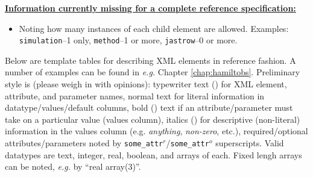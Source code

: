 \textbf{\underline{Information currently missing for a complete reference specification:}}
\begin{itemize}
  \item{Noting how many instances of each child element are allowed.  Examples: \texttt{simulation}--1 only, \texttt{method}--1 or more, \texttt{jastrow}--0 or more}.
\end{itemize}


Below are template tables for describing XML elements in reference fashion.  A number of examples can be found in \textit{e.g.} Chapter \ref{chap:hamiltobs}.  Preliminary style is (please weigh in with opinions): typewriter text (\ilatex{\\texttt\{\}}) for XML element, attribute, and parameter names, normal text for literal information in datatype/values/default columns, bold (\ilatex{\\textbf\{\}}) text if an attribute/parameter must take on a particular value (values column), italics (\ilatex{\\textit\{\}}) for descriptive (non-literal) information in the values column (e.g. \textit{anything}, \textit{non-zero}, etc.), required/optional attributes/parameters noted by \texttt{some\_attr$^r$}/\texttt{some\_attr$^o$} superscripts.  Valid datatypes are text, integer, real, boolean, and arrays of each.  Fixed lengh arrays can be noted, \textit{e.g.} by ``real array(3)''.


